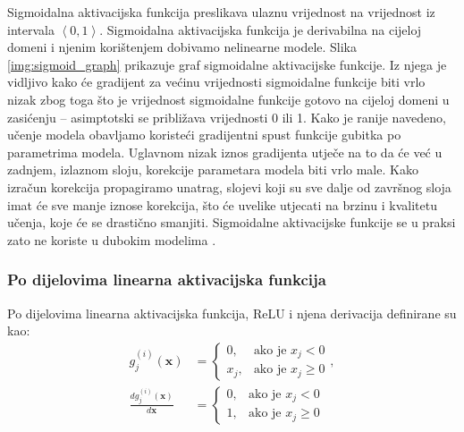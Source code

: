 \documentclass[times, utf8, diplomski, numeric]{fer}
\begin{document}
\noindent Sigmoidalna aktivacijska funkcija preslikava ulaznu vrijednost na vrijednost iz intervala $\left< 0, 1\right>$. Sigmoidalna aktivacijska funkcija je derivabilna na cijeloj domeni i njenim korištenjem dobivamo nelinearne modele. 
Slika \ref{img:sigmoid_graph} prikazuje graf sigmoidalne aktivacijske funkcije. 
Iz njega je vidljivo kako će gradijent za većinu vrijednosti sigmoidalne funkcije biti vrlo nizak zbog toga što je vrijednost sigmoidalne funkcije gotovo na cijeloj domeni u zasićenju  -- asimptotski se približava vrijednosti 0 ili 1.
Kako je ranije navedeno, učenje modela obavljamo koristeći gradijentni spust funkcije gubitka po parametrima modela. 
Uglavnom nizak iznos gradijenta utječe na to da će već u zadnjem, izlaznom sloju, korekcije parametara modela biti vrlo male. 
Kako izračun korekcija propagiramo unatrag, slojevi koji su sve dalje od završnog sloja imat će sve manje iznose korekcija, što će uvelike utjecati na brzinu i kvalitetu učenja, koje će se drastično smanjiti.
Sigmoidalne aktivacijske funkcije se u praksi zato ne koriste u dubokim modelima \citep{seminar:rela}.

\subsubsection{Po dijelovima linearna aktivacijska funkcija}
Po dijelovima linearna aktivacijska funkcija, ReLU  i njena derivacija definirane su kao:
\begin{align}
 g^{(i)}_j(\mathbf{x})&=\left\{
 \begin{array}{ll}
 0,  & \mbox{ako je } x_j < 0 \\
 x_j, & \mbox{ako je } x_j \geq 0 
 \end{array}
 \right. , \\
 \frac{dg^{(i)}_j(\mathbf{x})}{d\mathbf{x}}&=\left\{
 \begin{array}{ll}
 0,  & \mbox{ako je } x_j < 0 \\
 1, & \mbox{ako je } x_j \geq 0 
 \end{array}
 \right.
\end{align}
\end{document}
